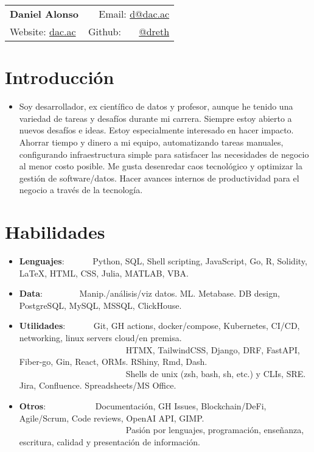 \documentclass[a4paper,20pt]{article}
\newcommand{\resumeItem}[2]{
  \item\small{
    \textbf{#1}{: #2 \vspace{-2pt}}
  }
}
\newcommand{\resumeSubItem}[2]{\resumeItem{#1}{#2}\vspace{-3pt}}
\newcommand{\resumeSubHeadingListStart}{\begin{itemize}[leftmargin=*]}
\newcommand{\resumeSubHeadingListEnd}{\end{itemize}}
\begin{document}
\begin{tabular*}{\textwidth}{l@{\extracolsep{\fill}}r}
  \textbf{{\LARGE Daniel Alonso}} & Email: {\color{blue}\href{mailto:}{d@dac.ac}}\\
  Website: {\color{blue}\href{https://dac.ac}{dac.ac}} & Github: ~~~{\color{blue}\href{https://github.com/dreth}{@dreth}}
\end{tabular*}




            
\vspace{-3pt}
\section{Introducción}
{\begin{itemize} \itemsep-0.24em
\item {Soy desarrollador, ex científico de datos y profesor, aunque he tenido una variedad de tareas y desafíos durante mi carrera. Siempre estoy abierto a nuevos desafíos e ideas. Estoy especialmente interesado en hacer impacto. Ahorrar tiempo y dinero a mi equipo, automatizando tareas manuales, configurando infraestructura simple para satisfacer las necesidades de negocio al menor costo posible. Me gusta desenredar caos tecnológico y optimizar la gestión de software/datos. Hacer avances internos de productividad para el negocio a través de la tecnología.}
\end{itemize}}
        


            
\vspace{-3pt}
\section{Habilidades}
  \resumeSubHeadingListStart
            
        
\vspace{-1pt}
\resumeSubItem{Lenguajes}{~~~~~~Python, SQL, Shell scripting, JavaScript, Go, R, Solidity, LaTeX, HTML, CSS, Julia, MATLAB, VBA.}
\vspace{-1pt}
\resumeSubItem{Data}{~~~~~~~~Manip./análisis/viz datos. ML. Metabase. DB design, PostgreSQL, MySQL, MSSQL, ClickHouse.}
\vspace{-1pt}
\resumeSubItem{Utilidades}{~~~~~~Git, GH actions, docker/compose, Kubernetes, CI/CD, networking, linux servers cloud/en premisa.\\~~~~~~~~~~~~~~~~~~~~~~~~~HTMX, TailwindCSS, Django, DRF, FastAPI, Fiber-go, Gin, React, ORMs.  RShiny, Rmd, Dash.\\~~~~~~~~~~~~~~~~~~~~~~~~~Shells de unix (zsh, bash, sh, etc.) y CLIs, SRE. Jira, Confluence. Spreadsheets/MS Office.}
\vspace{-1pt}
\resumeSubItem{Otros}{~~~~~~~~~~~Documentación, GH Issues, Blockchain/DeFi, Agile/Scrum, Code reviews, OpenAI API, GIMP.\\~~~~~~~~~~~~~~~~~~~~~~~~~Pasión por lenguajes, programación, enseñanza, escritura, calidad y presentación de información.}
\resumeSubHeadingListEnd
\end{document}
